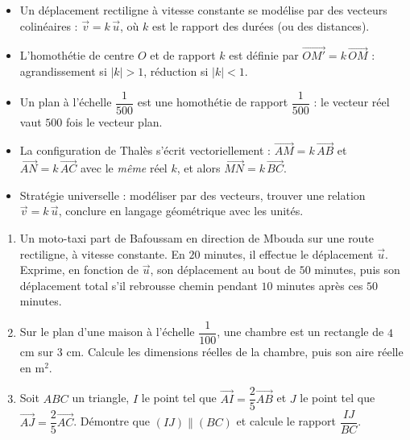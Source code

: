 \documentclass[11pt]{article}
\newcommand{\cle}[1]{{\popxbold\color{popdark}#1}}
\begin{document}
\begin{aretenir}
\begin{itemize}
\item Un déplacement rectiligne à vitesse constante se modélise par des vecteurs \cle{colinéaires} : $\vec{v} = k\,\vec{u}$, où $k$ est le rapport des durées (ou des distances).
\item L'\cle{homothétie} de centre $O$ et de rapport $k$ est définie par $\overrightarrow{OM'} = k\,\overrightarrow{OM}$ : agrandissement si $|k| > 1$, réduction si $|k| < 1$.
\item Un plan à l'échelle $\dfrac{1}{500}$ est une homothétie de rapport $\dfrac{1}{500}$ : le vecteur réel vaut $500$ fois le vecteur plan.
\item La configuration de Thalès s'écrit vectoriellement : $\overrightarrow{AM} = k\,\overrightarrow{AB}$ et $\overrightarrow{AN} = k\,\overrightarrow{AC}$ avec le \emph{même} réel $k$, et alors $\overrightarrow{MN} = k\,\overrightarrow{BC}$.
\item Stratégie universelle : modéliser par des vecteurs, trouver une relation $\vec{v} = k\,\vec{u}$, conclure en langage géométrique avec les unités.
\end{itemize}
\end{aretenir}

\begin{exercice}
\begin{enumerate}
\item Un moto-taxi part de Bafoussam en direction de Mbouda sur une route rectiligne, à vitesse constante. En $20$ minutes, il effectue le déplacement $\vec{u}$. Exprime, en fonction de $\vec{u}$, son déplacement au bout de $50$ minutes, puis son déplacement total s'il rebrousse chemin pendant $10$ minutes après ces $50$ minutes.
\item Sur le plan d'une maison à l'échelle $\dfrac{1}{100}$, une chambre est un rectangle de $4$ cm sur $3$ cm. Calcule les dimensions réelles de la chambre, puis son aire réelle en m$^2$.
\item Soit $ABC$ un triangle, $I$ le point tel que $\overrightarrow{AI} = \dfrac{2}{5}\overrightarrow{AB}$ et $J$ le point tel que $\overrightarrow{AJ} = \dfrac{2}{5}\overrightarrow{AC}$. Démontre que $(IJ) \parallel (BC)$ et calcule le rapport $\dfrac{IJ}{BC}$.
\end{enumerate}
\end{exercice}
\end{document}
